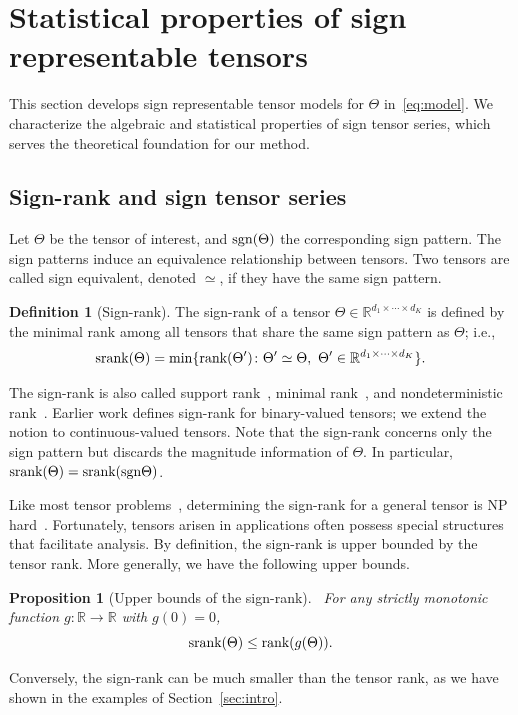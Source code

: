 \documentclass[11pt]{article}
\theoremstyle{plain}
\newtheorem{prop}{Proposition}
\theoremstyle{definition}
\newtheorem{defn}{Definition}
\def\sign{\textup{sgn}}
\def\srank{\textup{srank}}
\def\rank{\textup{rank}}
\begin{document}
\section{Statistical properties of sign representable tensors}\label{sec:representation}
This section develops sign representable tensor models for $\Theta$ in~\eqref{eq:model}. We characterize the algebraic and statistical properties of sign tensor series, which serves the theoretical foundation for our method. 


\subsection{Sign-rank and sign tensor series}\label{sec:sign-rank}
Let $\Theta$ be the tensor of interest, and $\sign (\Theta)$ the corresponding sign pattern. The sign patterns induce an equivalence relationship between tensors. Two tensors are called sign equivalent, denoted $\simeq$, if they have the same sign pattern.\\

\begin{defn}[Sign-rank]
The sign-rank of a tensor $\Theta\in\mathbb{R}^{d_1\times \cdots \times d_K}$ is defined by the minimal rank among all tensors that share the same sign pattern as $\Theta$; i.e.,
\[
\srank(\Theta) = \min \{\rank(\Theta')\colon  \Theta'\simeq \Theta,\ \Theta'\in\mathbb{R}^{d_1\times \cdots \times d_K}\}.
\]
\end{defn}
The sign-rank is also called {support rank}~\citep{cohn2013fast}, {minimal rank}~\citep{alon2016sign}, and {nondeterministic rank}~\citep{de2003nondeterministic}. Earlier work defines sign-rank for binary-valued tensors; we extend the notion to continuous-valued tensors. Note that the sign-rank concerns only the sign pattern but discards the magnitude information of $\Theta$. In particular, $\srank(\Theta)=\srank(\sign \Theta)$. 

Like most tensor problems~\citep{hillar2013most}, determining the sign-rank for a general tensor is NP hard~\citep{alon2016sign}. Fortunately, tensors arisen in applications often possess special structures that facilitate analysis. By definition, the sign-rank is upper bounded by the tensor rank. More generally, we have the following upper bounds. \\

\begin{prop}[Upper bounds of the sign-rank]~\label{cor:monotonic} For any strictly monotonic function $g\colon \mathbb{R}\to \mathbb{R}$ with $g(0)=0$,
\[
\textup{srank}(\Theta)\leq\rank(g(\Theta)).
\]
\end{prop}
Conversely, the sign-rank can be much smaller than the tensor rank, as we have shown in the examples of Section~\ref{sec:intro}.\\
\end{document}
